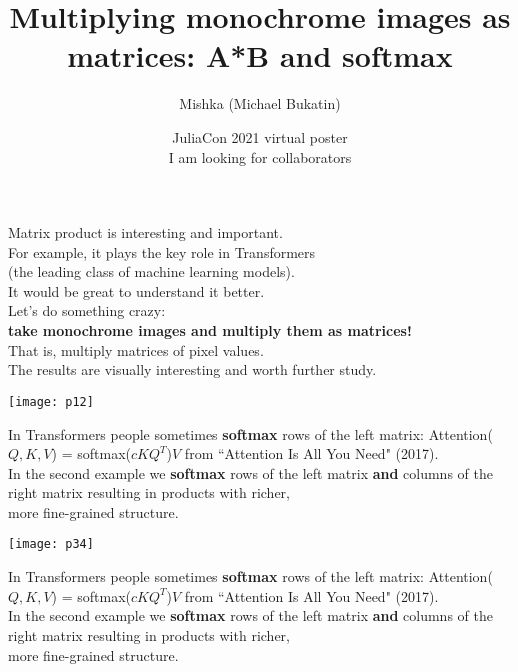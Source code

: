 \documentclass{beamer}
\newcommand{\msmagenta}[1]{{\color{mymagenta} #1}}
\begin{document}
\title{Multiplying monochrome images as matrices: A*B and softmax}
\author{Mishka (Michael Bukatin)}

\date
{\footnotesize 
JuliaCon 2021 virtual poster\\[2ex]

\msmagenta{I am looking for collaborators}
}

\begin{frame}
  \titlepage
\end{frame}

\begin{frame}
Matrix product is interesting and important.\\[2ex]

For example, it plays the key role in Transformers\\ (the leading class of machine learning models).\\[2ex]

It would be great to understand it better.\\[2ex]

Let's do something crazy:\\
\msmagenta{\bf take monochrome images and multiply them as matrices!}\\[2ex]

That is, \msmagenta{multiply matrices of pixel values.}\\[2ex]

The results are visually interesting and worth further study.


\end{frame}



\begin{frame}

\texttt{[image: p12]}

In Transformers people sometimes {\bf softmax} rows of the left matrix:
{\scriptsize Attention($Q, K, V$) = softmax($cKQ^T$)$V$ from ``Attention Is All You Need" (2017).}\\[1ex]

In the second example we {\bf softmax} rows of the left matrix {\bf and} columns of the right matrix resulting in products
with richer,\\ more fine-grained structure.

\end{frame}

\begin{frame}

\texttt{[image: p34]}

In Transformers people sometimes {\bf softmax} rows of the left matrix:
{\scriptsize Attention($Q, K, V$) = softmax($cKQ^T$)$V$ from ``Attention Is All You Need" (2017).}\\[1ex]

In the second example we {\bf softmax} rows of the left matrix {\bf and} columns of the right matrix resulting in products
with richer,\\ more fine-grained structure.

\end{frame}
\end{document}
